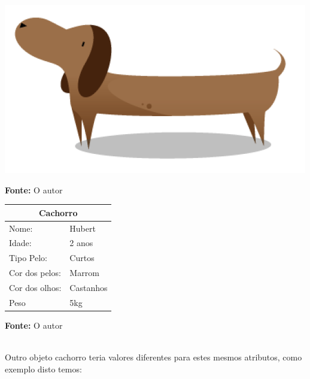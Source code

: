 \begin{minipage}{\textwidth}
  \begin{minipage}[b]{0.49\textwidth}
    \centering
    \includegraphics[scale=0.4]{imagens/cachorro-objeto.png}
    \caption*{\textbf{Fonte:} O autor}    
    \label{fig:cachorro-objeto-1}
  \end{minipage}
  \hfill
  \begin{minipage}[b]{0.52\textwidth}
    \centering
    \begin{tabular}{|l|l|}
      \hline
      \multicolumn{2}{|c|}{Cachorro}      \\ \hline
        Nome:                 & Hubert    \\ \hline
        Idade:                & 2 anos    \\ \hline
        Tipo Pelo:            & Curtos    \\ \hline
        Cor dos pelos:        & Marrom    \\ \hline
        Cor dos olhos:        & Castanhos \\ \hline
        Peso                  & 5kg       \\ \hline
      \end{tabular}
      \caption*{\textbf{Fonte:} O autor}  
    \end{minipage}
  \end{minipage} \\

  Outro objeto cachorro teria valores diferentes para estes mesmos atributos, como exemplo disto temos:

